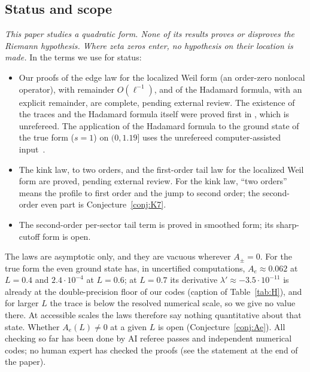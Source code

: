 \documentclass[11pt]{amsart}
\newcommand{\e}[1]{\cdot 10^{#1}}
\theoremstyle{definition}
\theoremstyle{remark}
\numberwithin{equation}{section}
\begin{document}
\subsection{Status and scope}\label{sec:status}
\emph{This paper studies a quadratic form. None of its results proves or disproves the Riemann hypothesis. Where zeta zeros enter, no hypothesis on their location is made.} In the terms we use for status:
\begin{itemize}
\item Our proofs of the edge law for the localized Weil form (an order-zero nonlocal operator), with remainder $O(\ell^{-1})$, and of the Hadamard formula, with an explicit remainder, are complete, pending external review. The existence of the traces and the Hadamard formula itself were proved first in \cite[\S3.3, Thms.~2.1--2.2]{BT26}, which is unrefereed. The application of the Hadamard formula to the ground state of the true form ($s=1$) on $(0,1.19]$ uses the unrefereed computer-assisted input~\cite{GS}.
\item The kink law, to two orders, and the first-order tail law for the localized Weil form are proved, pending external review. For the kink law, ``two orders'' means the profile to first order and the jump to second order; the second-order even part is Conjecture~\ref{conj:K7}.
\item The second-order per-sector tail term is proved in smoothed form; its sharp-cutoff form is open.
\end{itemize}
The laws are asymptotic only, and they are vacuous wherever $A_\pm=0$. For the true form the even ground state has, in uncertified computations, $A_e\approx0.062$ at $L=0.4$ and $2.4\e{-4}$ at $L=0.6$; at $L=0.7$ its derivative $\lambda'\approx-3.5\e{-11}$ is already at the double-precision floor of our codes (caption of Table~\ref{tab:H}), and for larger $L$ the trace is below the resolved numerical scale, so we give no value there. At accessible scales the laws therefore say nothing quantitative about that state. Whether $A_e(L)\ne0$ at a given $L$ is open (Conjecture~\ref{conj:Ae}). All checking so far has been done by AI referee passes and independent numerical codes; no human expert has checked the proofs (see the statement at the end of the paper).
\end{document}
